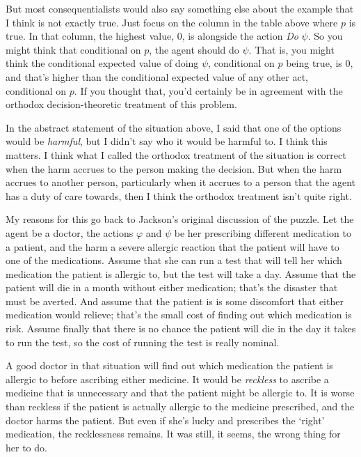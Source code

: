 But most consequentialists would also say something else about the example that I think is not exactly true. Just focus on the column in the table above where $p$ is true. In that column, the highest value, 0, is alongside the action \textit{Do} $\psi$. So you might think that conditional on $p$, the agent should do $\psi$. That is, you might think the conditional expected value of doing $\psi$, conditional on $p$ being true, is 0, and that's higher than the conditional expected value of any other act, conditional on $p$. If you thought that, you'd certainly be in agreement with the orthodox decision-theoretic treatment of this problem.

In the abstract statement of the situation above, I said that one of the options would be \textit{harmful}, but I didn't say who it would be harmful to. I think this matters. I think what I called the orthodox treatment of the situation is correct when the harm accrues to the person making the decision. But when the harm accrues to another person, particularly when it accrues to a person that the agent has a duty of care towards, then I think the orthodox treatment isn't quite right.

My reasons for this go back to Jackson's original discussion of the puzzle. Let the agent be a doctor, the actions $\varphi$ and $\psi$ be her prescribing different medication to a patient, and the harm a severe allergic reaction that the patient will have to one of the medications. Assume that she can run a test that will tell her which medication the patient is allergic to, but the test will take a day. Assume that the patient will die in a month without either medication; that's the disaster that must be averted. And assume that the patient is is some discomfort that either medication would relieve; that's the small cost of finding out which medication is risk. Assume finally that there is no chance the patient will die in the day it takes to run the test, so the cost of running the test is really nominal.

A good doctor in that situation will find out which medication the patient is allergic to before ascribing either medicine. It would be \textit{reckless} to ascribe a medicine that is unnecessary and that the patient might be allergic to. It is worse than reckless if the patient is actually allergic to the medicine prescribed, and the doctor harms the patient. But even if she's lucky and prescribes the `right' medication, the recklessness remains. It was still, it seems, the wrong thing for her to do.


